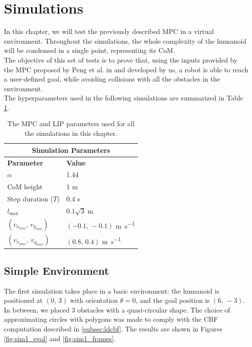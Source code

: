 \section{Simulations}\label{sec:simulations}

In this chapter, we will test the previously described MPC in a virtual environment. Throughout the simulations, the whole complexity of the humanoid will be condensed in a single point, representing its CoM.\\
The objective of this set of tests is to prove that, using the inputs provided by the MPC proposed by Peng et al. in \cite{peng_main_paper} and developed by us, a robot is able to reach a user-defined goal, while avoiding collisions with all the obstacles in the environment.\\
The hyperparameters used in the following simulations are summarized in Table \ref{table:sim_params}.

\begin{table}[h]
        \begin{tabular}{ |p{4cm}||p{4cm}| }
             \hline
             \multicolumn{2}{|c|}{Simulation Parameters} \\
             \hline
             \textbf{Parameter} & \textbf{Value}\\
             \hline
             $\alpha$   & 1.44 \\
             CoM height & 1 \si{\meter} \\
             Step duration ($T$) & 0.4 \si{\second} \\
             $l_{\max}$ & $0.1 \sqrt{3} \;\si{\meter}$ \\
             $\left( v_{x_{min}},\, v_{y_{min}} \right)$ & $\left( -0.1,\, -0.1 \right)$ \si{\meter\per\second}\\
             $\left( v_{x_{max}},\, v_{y_{max}} \right)$ & $\left( 0.8,\, 0.4 \right)$ \si{\meter\per\second}\\
             \hline
        \end{tabular}
    \centering
    \caption{The MPC and LIP parameters used for all the simulations in this chapter.}
    \label{table:sim_params}
\end{table}

\subsection{Simple Environment}\label{subsec:sim_simple_env}
The first simulation takes place in a basic environment: the humanoid is positioned at $(0,\,3)$ with orientation $\theta = 0$, and the goal position is $(6,\,-3)$. In between, we placed 3 obstacles with a quasi-circular shape. The choice of approximating circles with polygons was made to comply with the CBF computation described in \ref{subsec:ldcbf}. The results are shown in Figures \ref{fig:sim1_evol} and \ref{fig:sim1_frames}.

